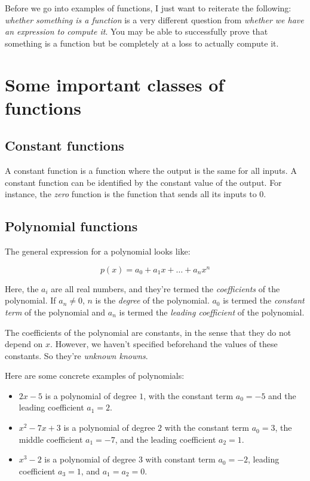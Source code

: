 \documentclass{amsart}
\begin{document}
Before we go into examples of functions, I just want to reiterate the
following: {\em whether something is a function} is a very different
question from {\em whether we have an expression to compute it}. You may be
able to successfully prove that something is a function but be
completely at a loss to actually compute it.

\section{Some important classes of functions}

\subsection{Constant functions}

A constant function is a function where the output is the same for all
inputs. A constant function can be identified by the constant value of
the output. For instance, the {\em zero} function is the function that
sends all its inputs to $0$.
\subsection{Polynomial functions}

The general expression for a polynomial looks like:

\begin{equation*}
  p(x) = a_0 + a_1x + \dots + a_nx^n
\end{equation*}

Here, the $a_i$ are all real numbers, and they're termed the {\em
coefficients} of the polynomial. If $a_n \ne 0$, $n$ is the {\em
degree} of the polynomial. $a_0$ is termed the {\em constant term} of
the polynomial and $a_n$ is termed the {\em leading coefficient} of the
polynomial.

The coefficients of the polynomial are constants, in the sense that
they do not depend on $x$. However, we haven't specified beforehand
the values of these constants. So they're {\em unknown knowns}.

Here are some concrete examples of polynomials:

\begin{itemize}
\item $2x - 5$ is a polynomial of degree $1$, with the constant term
  $a_0 = -5$ and the leading coefficient $a_1 = 2$.
\item $x^2 - 7x + 3$ is a polynomial of degree $2$ with the constant
  term $a_0 = 3$, the middle coefficient $a_1 = -7$, and the leading
  coefficient $a_2 = 1$.
\item $x^3 - 2$ is a polynomial of degree $3$ with constant term $a_0
  = -2$, leading coefficient $a_3 = 1$, and $a_1 = a_2 = 0$.
\end{itemize}
\end{document}
